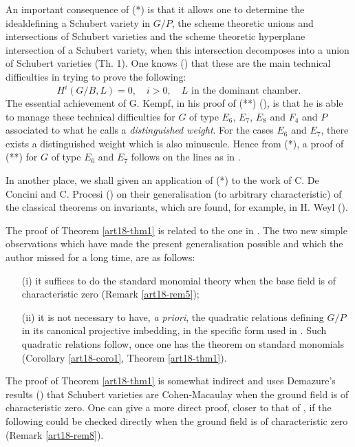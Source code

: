 An important consequence of (*) is that it allows one to determine the ideal\pageoriginale defining a Schubert variety in $G/P$, the scheme theoretic unions and intersections of Schubert varieties and the scheme theoretic hyperplane intersection of a Schubert variety, when this intersection decomposes into a union of Schubert varieties (\cf Th. 1). One knows (\cf \cite{art18-key12}) that these are the main technical difficulties in trying to prove the following:
\begin{equation*}
H^i (G/ B, L) = 0, \quad i > 0, \quad L \text{ in the dominant chamber.}
\tag{**}
\end{equation*}
The essential achievement of G. Kempf, in his proof of (**) (\cf \cite{art18-key11}), is that he is able to manage these technical difficulties for $G$ of type $E_6$, $E_7$, $E_8$ and $F_4$ and $P$ associated to what he calls a {\em distinguished weight}. For the cases $E_6$ and $E_7$, there exists a distinguished weight which is also minuscule. Hence from (*), a proof of (**) for $G$ of type $E_6$ and $E_7$ follows on the lines as in \cite{art18-key12}.

In another place, we shall given an application of (*) to the work of C. De Concini and C. Procesi (\cf \cite{art18-key7}) on their generalisation (to arbitrary characteristic) of the classical theorems on invariants, which are found, for example, in H. Weyl (\cf [24]).

The proof of Theorem \ref{art18-thm1} is related to the one in \cite{art18-key13}. The two new simple observations which have made the present generalisation possible and which the author missed for a long time, are as follows:
\begin{itemize}
\item[(i)] it suffices to do the standard monomial theory when the base field is of characteristic zero (\cf Remark \ref{art18-rem5});

\item[(ii)] it is not necessary to have, {\em a priori}, the quadratic relations defining $G/P$ in its canonical projective imbedding, in the specific form used in \cite{art18-key13}. Such quadratic relations follow, once one has the theorem on standard monomials (\cf Corollary \ref{art18-coro1}, Theorem \ref{art18-thm1}). 
\end{itemize}

The proof of Theorem \ref{art18-thm1} is somewhat indirect and uses Demazure's results (\cf \cite{art18-key8}) that Schubert varieties are Cohen-Macaulay when the ground field is of characteristic zero. One can give a more direct proof, closer to that of \cite{art18-key13}, if the following could be checked directly when the ground field is of characteristic zero (\cf Remark \ref{art18-rem8}).

